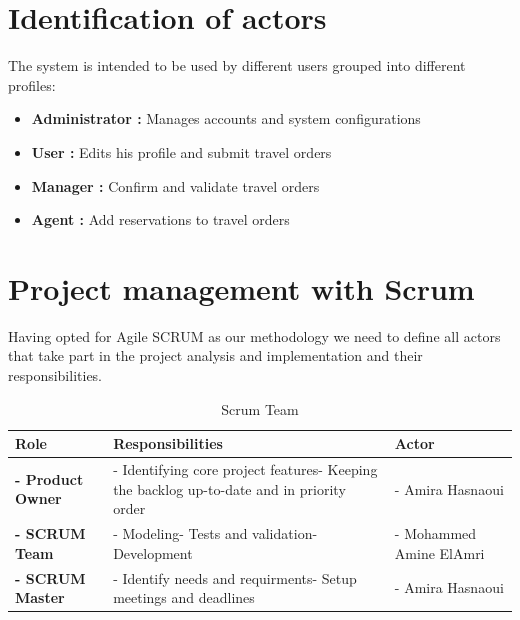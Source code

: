 \section{Identification of actors}
The system is intended to be used by different users grouped into different profiles:
\begin{itemize}
    \item \textbf{Administrator : }Manages accounts and system configurations
    \item \textbf{User : }Edits his profile and submit travel orders
    \item \textbf{Manager : }Confirm and validate travel orders
    \item \textbf{Agent : }Add reservations to travel orders
\end{itemize}
\section{Project management with Scrum}
   Having opted for Agile SCRUM as our methodology we need to define all actors that take part in the project analysis and implementation and their responsibilities.

\begin{table}[H]
\caption{ Scrum Team }
\begin{tabular}{|p{}|p{}|p{}|}
\hline
\textbf{Role} 
&\textbf{Responsibilities}
&\textbf{Actor}\\
\hline

\hline 
\textbf{- Product Owner} 
&- Identifying core project features\newline{}- Keeping the backlog up-to-date and in priority order\newline{}
&- Amira Hasnaoui\\
\hline

\hline
\textbf{- SCRUM Team} 
&- Modeling\newline{}- Tests and validation\newline{}- Development\newline{}
&- Mohammed Amine ElAmri\\
\hline

\hline
\textbf{- SCRUM Master} 
&- Identify needs and requirments\newline{}- Setup meetings and deadlines
&- Amira Hasnaoui\\
\hline



\end{tabular}
\end{table}
     


